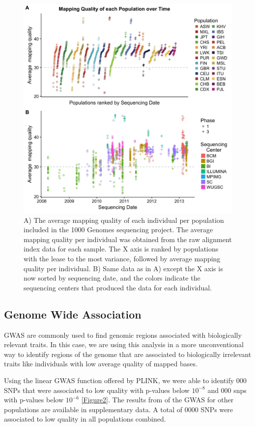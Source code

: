 \documentclass[12pt]{amsart}
\begin{document}
\begin{figure}
\includegraphics[width=\hsize,keepaspectratio]{MapQualOverTime.jpg}

\caption{A) The average mapping quality of each individual per population included in the 1000 Genomes sequencing project. The average mapping quality per individual was obtained from the raw alignment index data for each sample. The X axis is ranked by populations with the lease to the most variance, followed by average mapping quality per individual. B) Same data as in A) except the X axis is now sorted by sequencing date, and the colors indicate the sequencing centers that produced the data for each individual.}
\label{Figure1}
\end{figure}


\subsection{Genome Wide Association}
GWAS are commonly used to find genomic regions associated with biologically relevant traits. In this case, we are using this analysis in a more unconventional way to identify regions of the genome that are associated to biologically irrelevant traits like individuals with low average quality of mapped bases.
 
Using the linear GWAS function offered by PLINK, we were able to identify 000 SNPs that were associated to low quality with  p-values below $10^{-8}$ and 000 snps with p-values below $10^{-6}$ \ref{Figure2}. 
The results from of the GWAS for other populations are available in supplementary data. 
A total of 0000 SNPs were associated to low quality in all populations combined.
\end{document}
